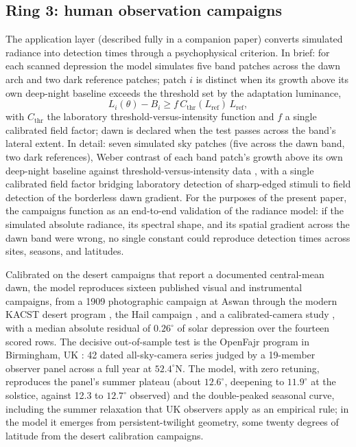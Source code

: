 \documentclass[preprint,12pt]{elsarticle}
\begin{document}
\subsection{Ring 3: human observation campaigns}
\label{sec:ring3}

The application layer (described fully in a companion paper) converts
simulated radiance into detection times through a psychophysical
criterion. In brief: for each scanned depression the model simulates
five band patches across the dawn arch and two dark reference
patches; patch $i$ is distinct when its growth above its own
deep-night baseline exceeds the threshold set by the adaptation
luminance,
\begin{equation}
L_i(\theta) - B_i \ge f\, C_{\mathrm{thr}}(L_{\mathrm{ref}})\, L_{\mathrm{ref}},
\end{equation}
with $C_{\mathrm{thr}}$ the laboratory threshold-versus-intensity
function and $f$ a single calibrated field factor; dawn is declared
when the test passes across the band's lateral extent. In detail: seven simulated sky patches (five across the dawn band, two
dark references), Weber contrast of each band patch's growth above its own
deep-night baseline against threshold-versus-intensity data
\citep{blackwell1946,crumey2014}, with a single calibrated field factor
bridging laboratory detection of sharp-edged stimuli to field detection of
the borderless dawn gradient. For the purposes of the present paper, the
campaigns function as an end-to-end validation of the radiance model: if
the simulated absolute radiance, its spectral shape, and its spatial
gradient across the dawn band were wrong, no single constant could
reproduce detection times across sites, seasons, and latitudes.

Calibrated on the desert campaigns that report a documented central-mean
dawn, the model
reproduces sixteen published visual and instrumental campaigns, from a
1909 photographic
campaign at Aswan \citep{miethe1909} through the modern KACST desert
program \citep{almostafa2005}, the Hail campaign \citep{khalifa2018}, and
a calibrated-camera study \citep{mawad2024}, with a median absolute
residual of $0.26^\circ$ of solar depression over the fourteen scored
rows. The decisive out-of-sample
test is the OpenFajr program in Birmingham, UK \citep{openfajr2016}: 42
dated all-sky-camera series judged by a 19-member observer panel across a
full year at $52.4^\circ$N. The model, with zero retuning, reproduces the
panel's summer plateau (about $12.6^\circ$, deepening to $11.9^\circ$ at
the solstice, against 12.3 to $12.7^\circ$
observed) and the double-peaked seasonal curve, including the summer
relaxation that UK observers apply as an empirical rule; in the model it
emerges from persistent-twilight geometry, some twenty degrees of
latitude from the desert calibration campaigns.
\end{document}
